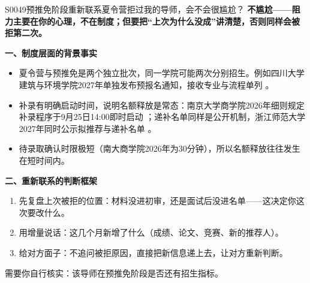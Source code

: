 \begin{qa}{S0049}{预推免阶段重新联系夏令营拒过我的导师，会不会很尴尬？}
\textbf{不尴尬——阻力主要在你的心理，不在制度；但要把“上次为什么没成”讲清楚，否则同样会被拒第二次。}

\textbf{一、制度层面的背景事实}
\begin{itemize}
  \item 夏令营与预推免是两个独立批次，同一学院可能两次分别招生。例如四川大学建筑与环境学院2027年单独发布预报名通知，接收专业与流程单列 。
  \item 补录有明确启动时间，说明名额释放是常态：南京大学商学院2026年细则规定补录程序于9月25日14:00即时启动 ；递补名单同样是公开机制，浙江师范大学2027年同时公示拟推荐与递补名单 。
  \item 待录取确认时限极短（南大商学院2026年为30分钟），所以名额释放往往发生在短时间内。
\end{itemize}

\textbf{二、重新联系的判断框架}
\begin{enumerate}
  \item 先复盘上次被拒的位置：材料没进初审，还是面试后没进名单——这决定你这次要改什么。
  \item 用增量说话：这几个月新增了什么（成绩、论文、竞赛、新的推荐人）。
  \item 给对方面子：不追问被拒原因，直接把新信息递上去，让对方重新判断。
\end{enumerate}

需要你自行核实：该导师在预推免阶段是否还有招生指标。
\end{qa}

